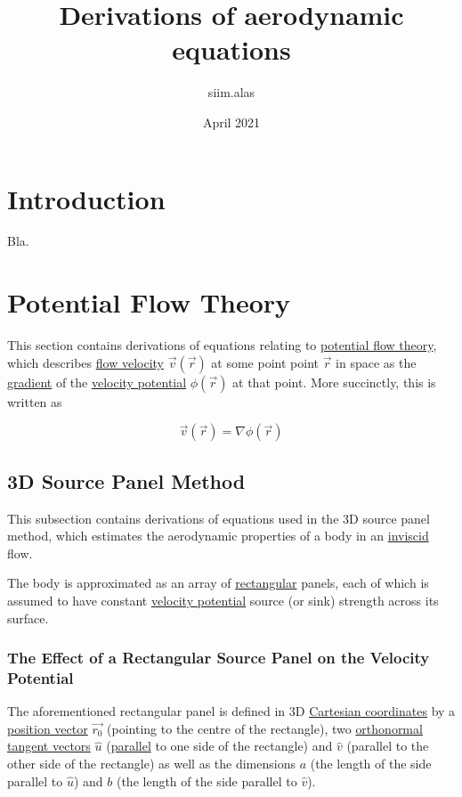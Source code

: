 ﻿\documentclass{article}
\title{Derivations of aerodynamic equations}
\author{siim.alas }
\date{April 2021}
\begin{document}
\maketitle

\section{Introduction}

Bla.

\section{Potential Flow Theory}

This section contains derivations of equations relating to \href{https://en.wikipedia.org/wiki/Potential_flow}{potential flow theory}, which describes \href{https://en.wikipedia.org/wiki/Flow_velocity}{flow velocity} $\vec{v}(\vec{r})$ at some point point $\vec{r}$ in space as the \href{https://en.wikipedia.org/wiki/Gradient}{gradient} of the \href{https://en.wikipedia.org/wiki/Velocity_potential}{velocity potential} $\phi(\vec{r})$ at that point. More succinctly, this is written as

\begin{equation}
    \label{eq:RelationOfVelocityAndVelocityPotential}
    \vec{v}(\vec{r}) = \nabla \phi(\vec{r})
\end{equation}

\subsection{3D Source Panel Method}

This subsection contains derivations of equations used in the 3D source panel method, which estimates the aerodynamic properties of a body in an \href{https://en.wikipedia.org/wiki/Inviscid_flow}{inviscid} flow.

The body is approximated as an array of \href{https://en.wikipedia.org/wiki/Rectangle}{rectangular} panels, each of which is assumed to have constant \href{https://en.wikipedia.org/wiki/Velocity_potential}{velocity potential} source (or sink) strength across its surface.

\subsubsection{The Effect of a Rectangular Source Panel on the Velocity Potential}

The aforementioned rectangular panel is defined in 3D \href{https://en.wikipedia.org/wiki/Cartesian_coordinate_system}{Cartesian coordinates} by a \href{https://en.wikipedia.org/wiki/Position_(geometry)}{position vector} $\vec{r_0}$ (pointing to the centre of the rectangle), two \href{https://en.wikipedia.org/wiki/Orthonormality}{orthonormal} \href{https://en.wikipedia.org/wiki/Tangent_vector}{tangent vectors} $\hat{u}$ (\href{https://en.wikipedia.org/wiki/Parallel_(geometry)}{parallel} to one side of the rectangle) and $\hat{v}$ (parallel to the other side of the rectangle) as well as the dimensions $a$ (the length of the side parallel to $\hat{u}$) and $b$ (the length of the side parallel to $\hat{v}$).
\end{document}
